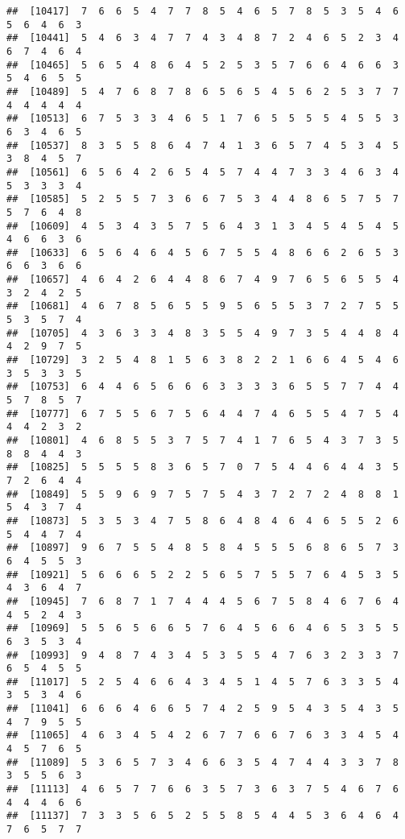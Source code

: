 \documentclass[
]{book}
\begin{document}
\begin{verbatim}
##  [10417]  7  6  6  5  4  7  7  8  5  4  6  5  7  8  5  3  5  4  6  5  6  4  6  3
##  [10441]  5  4  6  3  4  7  7  4  3  4  8  7  2  4  6  5  2  3  4  6  7  4  6  4
##  [10465]  5  6  5  4  8  6  4  5  2  5  3  5  7  6  6  4  6  6  3  5  4  6  5  5
##  [10489]  5  4  7  6  8  7  8  6  5  6  5  4  5  6  2  5  3  7  7  4  4  4  4  4
##  [10513]  6  7  5  3  3  4  6  5  1  7  6  5  5  5  5  4  5  5  3  6  3  4  6  5
##  [10537]  8  3  5  5  8  6  4  7  4  1  3  6  5  7  4  5  3  4  5  3  8  4  5  7
##  [10561]  6  5  6  4  2  6  5  4  5  7  4  4  7  3  3  4  6  3  4  5  3  3  3  4
##  [10585]  5  2  5  5  7  3  6  6  7  5  3  4  4  8  6  5  7  5  7  5  7  6  4  8
##  [10609]  4  5  3  4  3  5  7  5  6  4  3  1  3  4  5  4  5  4  5  4  6  6  3  6
##  [10633]  6  5  6  4  6  4  5  6  7  5  5  4  8  6  6  2  6  5  3  6  6  3  6  6
##  [10657]  4  6  4  2  6  4  4  8  6  7  4  9  7  6  5  6  5  5  4  3  2  4  2  5
##  [10681]  4  6  7  8  5  6  5  5  9  5  6  5  5  3  7  2  7  5  5  5  3  5  7  4
##  [10705]  4  3  6  3  3  4  8  3  5  5  4  9  7  3  5  4  4  8  4  4  2  9  7  5
##  [10729]  3  2  5  4  8  1  5  6  3  8  2  2  1  6  6  4  5  4  6  3  5  3  3  5
##  [10753]  6  4  4  6  5  6  6  6  3  3  3  3  6  5  5  7  7  4  4  5  7  8  5  7
##  [10777]  6  7  5  5  6  7  5  6  4  4  7  4  6  5  5  4  7  5  4  4  4  2  3  2
##  [10801]  4  6  8  5  5  3  7  5  7  4  1  7  6  5  4  3  7  3  5  8  8  4  4  3
##  [10825]  5  5  5  5  8  3  6  5  7  0  7  5  4  4  6  4  4  3  5  7  2  6  4  4
##  [10849]  5  5  9  6  9  7  5  7  5  4  3  7  2  7  2  4  8  8  1  5  4  3  7  4
##  [10873]  5  3  5  3  4  7  5  8  6  4  8  4  6  4  6  5  5  2  6  5  4  4  7  4
##  [10897]  9  6  7  5  5  4  8  5  8  4  5  5  5  6  8  6  5  7  3  6  4  5  5  3
##  [10921]  5  6  6  6  5  2  2  5  6  5  7  5  5  7  6  4  5  3  5  4  3  6  4  7
##  [10945]  7  6  8  7  1  7  4  4  4  5  6  7  5  8  4  6  7  6  4  4  5  2  4  3
##  [10969]  5  5  6  5  6  6  5  7  6  4  5  6  6  4  6  5  3  5  5  6  3  5  3  4
##  [10993]  9  4  8  7  4  3  4  5  3  5  5  4  7  6  3  2  3  3  7  6  5  4  5  5
##  [11017]  5  2  5  4  6  6  4  3  4  5  1  4  5  7  6  3  3  5  4  3  5  3  4  6
##  [11041]  6  6  6  4  6  6  5  7  4  2  5  9  5  4  3  5  4  3  5  4  7  9  5  5
##  [11065]  4  6  3  4  5  4  2  6  7  7  6  6  7  6  3  3  4  5  4  4  5  7  6  5
##  [11089]  5  3  6  5  7  3  4  6  6  3  5  4  7  4  4  3  3  7  8  3  5  5  6  3
##  [11113]  4  6  5  7  7  6  6  3  5  7  3  6  3  7  5  4  6  7  6  4  4  4  6  6
##  [11137]  7  3  3  5  6  5  2  5  5  8  5  4  4  5  3  6  4  6  4  7  6  5  7  7

\end{verbatim}
\end{document}
